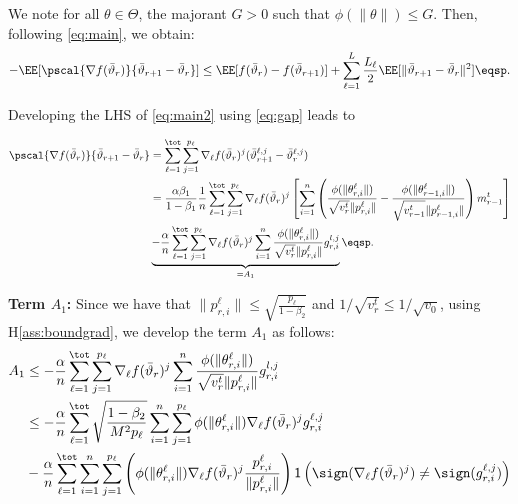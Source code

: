 \documentclass{article}
\begin{document}
We note for all $\theta \in \Theta$, the majorant $G > 0$ such that $\phi(\|\theta \|) \leq G$. 
Then, following \eqref{eq:main}, we obtain:
\begin{align}\label{eq:main2}
- \EE[  \pscal{\nabla f(\bar{\vartheta}_r)}{\bar{\vartheta}_{r+1} - \bar{\vartheta}_r}]  \leq  \EE[ f(\bar{\vartheta}_r) - f(\bar{\vartheta}_{r+1})] + \sum_{\ell =1}^L \frac{L_\ell}{2} \EE[  \| \bar{\vartheta}_{r+1} - \bar{\vartheta}_r \|^2] \eqsp.
\end{align}

Developing the LHS of \eqref{eq:main2} using \eqref{eq:gap} leads to

\begin{align}\label{eq:inner}
\pscal{\nabla f(\bar{\vartheta}_r)}{\bar{\vartheta}_{r+1} - \bar{\vartheta}_r} &= \sum_{\ell=1}^\tot \sum_{j=1}^{p_\ell} \nabla_{\ell} f(\bar{\vartheta}_r)^j (\bar{\vartheta}^{\ell,j}_{r+1} - \bar{\vartheta}^{\ell,j}_r) \\
& =  \frac{\alpha \beta_1}{1-\beta_1}\frac{1}{n}  \sum_{\ell=1}^\tot \sum_{j=1}^{p_\ell} \nabla_{\ell} f(\bar{\vartheta}_r)^j \left[   \sum_{i = 1}^n  \left( \frac{\phi(\|\theta_{r,i}^{\ell}\|)}{\sqrt{v^{t}_{r}} \|p_{r,i}^{\ell}\|} - \frac{\phi(\|\theta_{r-1,i}^{\ell}\|)}{\sqrt{v^{t}_{r-1}} \|p_{r-1,i}^{\ell}\|} \right) m^{t}_{r-1}  \right] \\
& \underbrace{ -\frac{\alpha}{n} \sum_{\ell=1}^\tot \sum_{j=1}^{p_\ell} \nabla_{\ell} f(\bar{\vartheta}_r)^j  \sum_{i = 1}^n \frac{\phi(\|\theta_{r,i}^{\ell}\|)}{\sqrt{v^{t}_{r}} \|p_{r,i}^{\ell}\|} g_{r,i}^{l,j}}_{= A_1}   \label{eqn1} \eqsp.
\end{align}

\textbf{ Term $A_1$:}
Since we have that $\|p_{r,i}^{\ell}\| \leq \sqrt{\frac{p_\ell}{1-\beta_2}}$ and $1/\sqrt{v^{t}_{r}} \leq 1/\sqrt{v_{0}}$, using H\ref{ass:boundgrad}, we develop the term $A_1$ as follows:
\begin{align}\notag
A_1 & \leq - \frac{\alpha}{n} \sum_{\ell=1}^\tot \sum_{j=1}^{p_\ell} \nabla_{\ell} f(\bar{\vartheta}_r)^j  \sum_{i = 1}^n \frac{\phi(\|\theta_{r,i}^{\ell}\|)}{\sqrt{v^{t}_{r}} \|p_{r,i}^{\ell}\|} g_{r,i}^{l,j}\\\notag
& \leq - \frac{\alpha}{n} \sum_{\ell=1}^\tot  \sqrt{\frac{1-\beta_2}{M^2 p_\ell}} \sum_{i = 1}^n \sum_{j=1}^{p_\ell}   \phi(\|\theta_{r,i}^{\ell}\|)  \nabla_{\ell} f(\bar{\vartheta}_r)^j  g^{\ell, j}_{r,i}\\\notag
& - \frac{\alpha}{n} \sum_{\ell=1}^\tot \sum_{i = 1}^n \sum_{j=1}^{p_\ell}   \left( \phi(\|\theta_{r,i}^{\ell}\|)  \nabla_{\ell} f(\bar{\vartheta}_r)^j  \frac{p_{r,i}^{\ell}}{ \|p_{r,i}^{\ell}\|}\right)\mathsf{1}\left( \sign(  \nabla_{\ell} f(\bar{\vartheta}_r)^j) \neq  \sign( g_{r,i}^{\ell,j}) \right)
\end{align}
\end{document}
